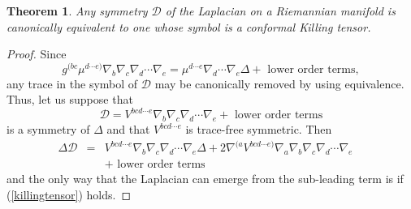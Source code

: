 \documentclass[a4paper,12pt]{amsart}
\newtheorem{thm}{Theorem}
\begin{document}
\begin{thm}\label{Killing} Any symmetry ${\mathcal D}$ of the Laplacian on a
Riemannian manifold is canonically equivalent to one whose
symbol is a conformal Killing tensor. \end{thm}
\begin{proof}Since
$$g^{(bc}\mu^{d\cdots e)}\nabla_b\nabla_c\nabla_d\cdots\nabla_e=
\mu^{d\cdots e}\nabla_d\cdots\nabla_e\Delta+\mbox{ lower order terms},$$
any trace in the symbol of ${\mathcal D}$ may be canonically removed by using
equivalence. Thus, let us suppose that
$${\mathcal D}=V^{bcd\cdots e}\nabla_b\nabla_c\nabla_d\cdots\nabla_e
+\mbox{ lower order terms}$$
is a symmetry of $\Delta$ and that $V^{bcd\cdots e}$ is trace-free symmetric.
Then
$$\begin{array}{rcr}\Delta{\mathcal D}&=&
V^{bcd\cdots e}\nabla_b\nabla_c\nabla_d\cdots\nabla_e\Delta+
2\nabla^{(a}V^{bcd\cdots e)}
  \nabla_a\nabla_b\nabla_c\nabla_d\cdots\nabla_e\quad\\[3pt]
&&+\mbox{ lower order terms}
\end{array}$$
and the only way that the Laplacian can emerge from the sub-leading term is if
(\ref{killingtensor}) holds.
\end{proof}
\end{document}
